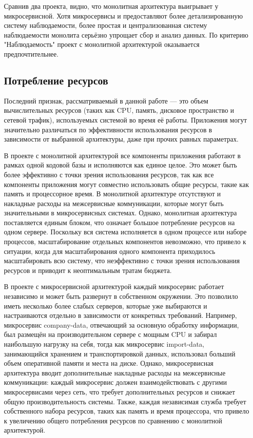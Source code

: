     Сравнив два проекта, видно, что монолитная архитектура выигрывает у микросервисной. Хотя микросервисы и предоставляют более детализированную систему наблюдаемости, более простая и централизованная систему наблюдаемости монолита серьёзно упрощает сбор и анализ данных. По критерию "Наблюдаемость" проект с монолитной архитектурой оказывается предпочтительнее.

\subsection{Потребление ресурсов}
    Последний признак, рассматриваемый в данной работе — это объем вычислительных ресурсов (таких как CPU, память, дисковое пространство и сетевой трафик), используемых системой во время её работы. Приложения могут значительно различаться по эффективности использования ресурсов в зависимости от выбранной архитектуры, даже при прочих равных параметрах.
    
    В проекте с монолитной архитектурой все компоненты приложения работают в рамках одной кодовой базы и исполняются как единое целое. Это может быть более эффективно с точки зрения использования ресурсов, так как все компоненты приложения могут совместно использовать общие ресурсы, такие как память и процессорное время. В монолитной архитектуре отсутствуют и накладные расходы на межсервисные коммуникации, которые могут быть значительными в микросервисных системах. Однако, монолитная архитектура поставляется единым блоком, что означает большое потребление ресурсов на одном сервере. Поскольку вся система исполняется в одном процессе или наборе процессов, масштабирование отдельных компонентов невозможно, что привело к ситуации, когда для масштабирования одного компонента приходилось масштабировать всю систему, что неэффективно с точки зрения использования ресурсов и приводит к неоптимальным тратам бюджета.
    
    В проекте с микросервисной архитектурой каждый микросервис работает независимо и может быть развернут в собственном окружении. Это позволило иметь несколько более слабых серверов, которые уже выбираются и настраиваются отдельно в зависимости от конкретных требований. Например, микросервис company-data, отвечающий за основную обработку информации, был размещён на производительном сервере с мощным CPU и забирал наибольшую нагрузку на себя, тогда как микросервис import-data, занимающийся хранением и транспортировкой данных, использовал больший объем оперативной памяти и места на диске. Однако, микросервисная архитектура вводит дополнительные накладные расходы на межсервисные коммуникации: каждый микросервис должен взаимодействовать с другими микросервисами через сеть, что требует дополнительных ресурсов и снижает общую производительность системы. Также, каждая независимая служба требует собственного набора ресурсов, таких как память и время процессора, что привело к увеличению общего потребления ресурсов по сравнению с монолитной архитектурой.
    
